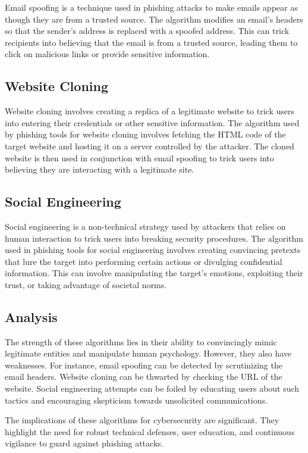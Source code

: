 \documentclass[openany]{report}
\begin{document}
Email spoofing is a technique used in phishing attacks to make emails appear as though they are from a trusted source. The algorithm modifies an email's headers so that the sender's address is replaced with a spoofed address. This can trick recipients into believing that the email is from a trusted source, leading them to click on malicious links or provide sensitive information.

\subsection{Website Cloning}

Website cloning involves creating a replica of a legitimate website to trick users into entering their credentials or other sensitive information. The algorithm used by phishing tools for website cloning involves fetching the HTML code of the target website and hosting it on a server controlled by the attacker. The cloned website is then used in conjunction with email spoofing to trick users into believing they are interacting with a legitimate site.

\subsection{Social Engineering}

Social engineering is a non-technical strategy used by attackers that relies on human interaction to trick users into breaking security procedures. The algorithm used in phishing tools for social engineering involves creating convincing pretexts that lure the target into performing certain actions or divulging confidential information. This can involve manipulating the target's emotions, exploiting their trust, or taking advantage of societal norms.

\subsection{Analysis}

The strength of these algorithms lies in their ability to convincingly mimic legitimate entities and manipulate human psychology. However, they also have weaknesses. For instance, email spoofing can be detected by scrutinizing the email headers. Website cloning can be thwarted by checking the URL of the website. Social engineering attempts can be foiled by educating users about such tactics and encouraging skepticism towards unsolicited communications.

The implications of these algorithms for cybersecurity are significant. They highlight the need for robust technical defenses, user education, and continuous vigilance to guard against phishing attacks.
\end{document}
